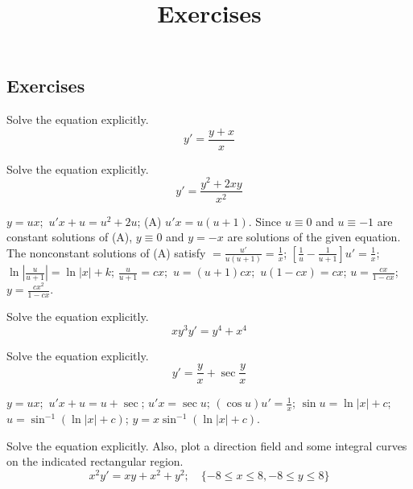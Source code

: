\documentclass{ximera}
\title{Exercises} \license{CC BY-NC-SA 4.0}
\begin{document}
\begin{abstract}
\end{abstract}
\maketitle

\begin{onlineOnly}
\section*{Exercises}
\end{onlineOnly}


\begin{problem}\label{exer:2.4.15} Solve the equation explicitly.
$$y'=\frac{y+x}{x}$$
\end{problem}

\begin{problem}\label{exer:2.4.16} Solve the equation explicitly.
$$y'=\frac{y^2+2xy}{x^2}$$



\begin{solution}
    $y=ux$;\ $u'x+u=u^2+2u$;\;
(A) $u'x=u(u+1)$. Since $u\equiv0$ and $u\equiv-1$ are constant
solutions of (A), $y\equiv0$ and $y=-x$ are
solutions of the given equation. The nonconstant solutions of (A)
satisfy
$=\frac{u'}{ u(u+1)}=\frac{1}{ x}$;\;
$\left[\frac{1}{ u}-\frac{1}{ u+1}\right]u'=\frac{1}{ x}$;\;
$\ln\left|\frac{u}{ u+1}\right|=\ln|x|+k$;\;
$\frac{u}{ u+1}=cx$;\ $u=(u+1)cx$;\ $u(1-cx)=cx$;\;
$u=\frac{cx}{1-cx}$;\;
$y=\frac{cx^2}{1-cx}$.
\end{solution}
\end{problem}

\begin{problem}\label{exer:2.4.17} Solve the equation explicitly.
$$xy^3y'=y^4+x^4$$ 
\end{problem}

 \begin{problem}\label{exer:2.4.18} Solve the equation explicitly.
 $$y'=\frac{y}{x}+\sec\frac{y}{x}$$

 

 \begin{solution}
     $y=ux$;\ $u'x+u=u+\sec$;\;
$u'x=\sec u$;\;
$(\cos u)u'=\frac{1}{ x}$;\;
$\sin u=\ln|x|+c$;\;
$u=\sin^{-1}(\ln|x|+c)$;\;
$y=x\sin^{-1}(\ln|x|+c)$.
 \end{solution}
\end{problem}

\begin{problem}\label{exer:2.4.19} Solve the equation explicitly.  Also, plot a direction field and some integral curves on the indicated rectangular region.
$$x^2y'=xy+x^2+y^2;   \quad \{-8\leq x\leq 8,-8\leq y\leq 8\}$$
\end{problem}
\end{document}
